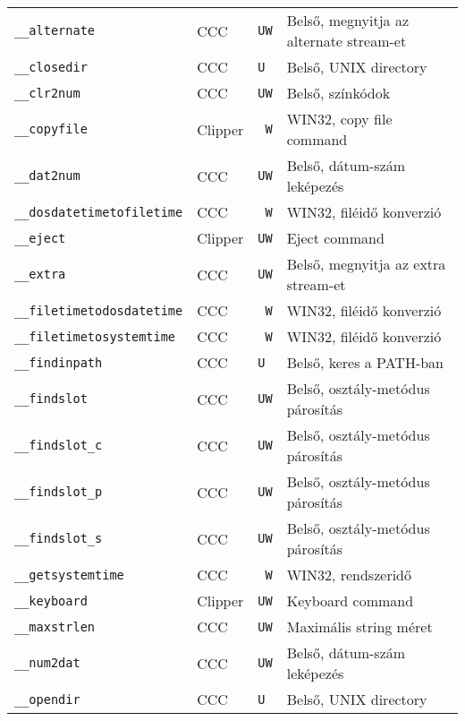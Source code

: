 \begin{tabular}{|l|l|l|l|}
\verb!__alternate!                 & CCC      &  {\tt UW} & Belső, megnyitja az alternate stream-et\\
\verb!__closedir!                  & CCC      &  {\tt U~} & Belső, UNIX directory\\
\verb!__clr2num!                   & CCC      &  {\tt UW} & Belső, színkódok\\
\verb!__copyfile!                  & Clipper  &  {\tt ~W} & WIN32, copy file command\\
\verb!__dat2num!                   & CCC      &  {\tt UW} & Belső, dátum-szám leképezés\\ 
\verb!__dosdatetimetofiletime!     & CCC      &  {\tt ~W} & WIN32, filéidő konverzió\\
\verb!__eject!                     & Clipper  &  {\tt UW} & Eject command\\
\verb!__extra!                     & CCC      &  {\tt UW} & Belső, megnyitja az extra stream-et\\ 
\verb!__filetimetodosdatetime!     & CCC      &  {\tt ~W} & WIN32, filéidő konverzió\\
\verb!__filetimetosystemtime!      & CCC      &  {\tt ~W} & WIN32, filéidő konverzió\\ 
\verb!__findinpath!                & CCC      &  {\tt U~} & Belső, keres a PATH-ban\\
\verb!__findslot!                  & CCC      &  {\tt UW} & Belső, osztály-metódus párosítás\\
\verb!__findslot_c!                & CCC      &  {\tt UW} & Belső, osztály-metódus párosítás\\
\verb!__findslot_p!                & CCC      &  {\tt UW} & Belső, osztály-metódus párosítás\\ 
\verb!__findslot_s!                & CCC      &  {\tt UW} & Belső, osztály-metódus párosítás\\ 
\verb!__getsystemtime!             & CCC      &  {\tt ~W} & WIN32, rendszeridő\\
\verb!__keyboard!                  & Clipper  &  {\tt UW} & Keyboard command\\
\verb!__maxstrlen!                 & CCC      &  {\tt UW} & Maximális string méret\\
\verb!__num2dat!                   & CCC      &  {\tt UW} & Belső, dátum-szám leképezés\\  
\verb!__opendir!                   & CCC      &  {\tt U~} & Belső, UNIX directory\\ 

\end{tabular}
